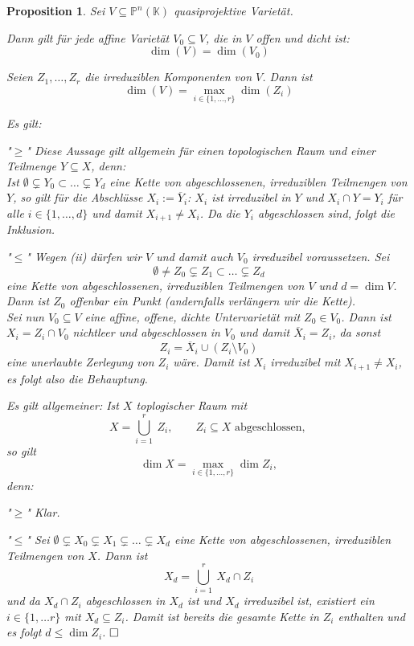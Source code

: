 \documentclass[11pt]{book}
\newtheorem{prop}[theorem]{Proposition}
\theoremstyle{nonumberbreak}
\newenvironment{pr}[1][]{\ifthenelse{\equal{#1}{}}{\proof}{\proof[#1]}\rm}{\endproof}
\begin{document}
\begin{spacing}{1.3}
\begin{prop}
Sei $V \subseteq \mathbb{P}^n(\mathbb{K})$ quasiprojektive Varietät.
\begin{compactenum}
\item Dann gilt für jede affine Varietät $V_0 \subseteq V$, die in $V$ offen und dicht ist:
$$\dim(V) = \dim(V_0)$$
\item Seien $Z_1, \ldots, Z_r$ die irreduziblen Komponenten von $V$. Dann ist 
$$\dim(V)= \max_{i \in \{1, \ldots, r \}} \dim(Z_i)$$
\end{compactenum}
\begin{pr}
\begin{compactenum}
\item Es gilt:
\begin{compactenum}
\item["$\geqslant$"] Diese Aussage gilt allgemein für einen topologischen Raum und einer Teilmenge $Y \subseteq X$, denn:\\
Ist $\emptyset \subsetneq Y_0 \subset \ldots \subsetneq Y_d$ eine Kette von abgeschlossenen, irreduziblen Teilmengen von $Y$, so gilt für die Abschlüsse $X_i := \overline{Y}_i$: $X_i$ ist irreduzibel in $Y$ und $X_i \cap Y=Y_i$ für alle $i \in \{1, \ldots, d \}$ und damit $X_{i+1} \neq X_i$. Da die $Y_i$ abgeschlossen sind, folgt die Inklusion.
\item["$\leqslant$"]Wegen (ii) dürfen wir $V$ und damit auch $V_0$ irreduzibel voraussetzen. Sei
$$\emptyset \neq Z_0 \subsetneq Z_1 \subset \ldots \subsetneq Z_d$$
eine Kette von abgeschlossenen, irreduziblen Teilmengen von $V$ und $d = \dim V$. Dann ist $Z_0$ offenbar ein Punkt (andernfalls verlängern wir die Kette).\\
Sei nun $V_0 \subseteq V$ eine affine, offene, dichte Untervarietät mit $Z_0 \in V_0$. Dann ist $X_i = Z_i \cap V_0$ nichtleer und abgeschlossen in $V_0$ und damit $\overline{X}_i = Z_i$, da sonst
$$Z_i = \overline{X}_i \cup \left( Z_i \setminus V_0 \right)$$
eine unerlaubte Zerlegung von $Z_i$ wäre. Damit ist $X_i$ irreduzibel mit $X_{i+1} \neq X_i$, es folgt also die Behauptung.
\end{compactenum}
\item Es gilt allgemeiner: Ist $X$ toplogischer Raum mit 
$$X= \bigcup_{i=1}^r\ Z_i, \qquad Z_i \subseteq X \textrm{ abgeschlossen, }$$
so gilt
$$\dim X= \max_{i \in \{1, \ldots, r \}} \dim Z_i,$$
denn:
\begin{compactenum}
\item["$\geqslant$"] Klar.
\item["$\leqslant$"] Sei
$\emptyset \subsetneq X_0 \subsetneq X_1 \subsetneq \ldots \subsetneq X_d$
eine Kette von abgeschlossenen, irreduziblen Teilmengen von $X$. Dann ist
$$X_d = \bigcup_{i=1}^r\ X_d \cap Z_i$$
und da $X_d \cap Z_i$ abgeschlossen in $X_d$ ist und $X_d$ irreduzibel ist, existiert ein $i \in \{1, \ldots r \}$ mit $X_d \subseteq Z_i$. Damit ist bereits die gesamte Kette in $Z_i$ enthalten und es folgt $d \leqslant \dim Z_i$. $\hfill\Box$
\end{compactenum}
\end{compactenum}
\end{pr}
\end{prop}


\end{spacing}
\end{document}
